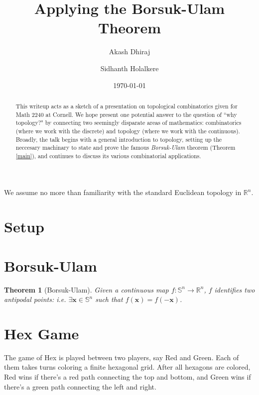 \documentclass[12pt]{amsart}
\newtheorem{thm}{Theorem}[section]
\theoremstyle{definition}
\begin{document}
\title{Applying the Borsuk-Ulam Theorem} \author{Akash Dhiraj}
 \author{Sidhanth Holalkere} \email{}
\date{\today}

\begin{abstract}
  This writeup acts as a sketch of a presentation on topological
  combinatorics given for Math 2240 at Cornell. We hope present one
  potential answer to the question of ``why topology?" by connecting
  two seemingly disparate areas of mathematics: combinatorics (where
  we work with the discrete) and topology (where we work with the
  continuous). Broadly, the talk begins with a general introduction to
  topology, setting up the neccesary machinary to state and prove the
  famous \emph{Borsuk-Ulam} theorem (Theorem \ref{main}), and
  continues to discuss its various combinatorial applications.
\end{abstract}

\maketitle

We assume no more than familiarity with the standard Euclidean
topology in $\mathbb R^n$.

\section{Setup}

\newpage

\section{Borsuk-Ulam}

\begin{thm}[Borsuk-Ulam]
  \label{main}
  Given a continuous map $f: \mathbb S^n \to \mathbb R^n$, $f$
  identifies two antipodal points: i.e.
  $\exists \mathbf x \in \mathbb S^n$ such that
  $f(\mathbf x) = f(-\mathbf x)$.
\end{thm}

\newpage

\section{Hex Game}

The game of Hex is played between two players, say Red and Green. Each
of them takes turns coloring a finite hexagonal grid. After all
hexagons are colored, Red wins if there's a red path connecting the
top and bottom, and Green wins if there's a green path connecting the
left and right.
\end{document}
